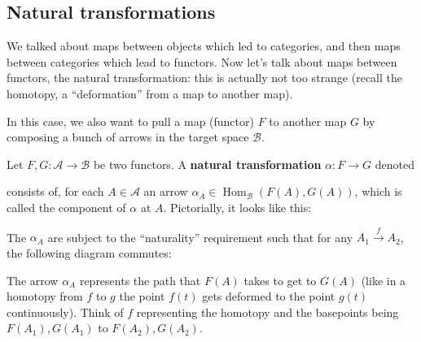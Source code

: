 \subsection{Natural transformations}
We talked about maps between objects which led to categories, and then maps between categories which lead to functors. Now let's talk about maps between functors, the natural transformation: this is actually not too strange (recall the homotopy, a ``deformation'' from a map to another map).

In this case, we also want to pull a map (functor) $F$ to another map $G$ by composing a bunch of arrows in the target space $\mathcal{B}$.
\begin{definition}
    Let $F,G \colon \mathcal{A} \to \mathcal{B}$ be two functors. A \textbf{natural transformation} $\alpha \colon F \to G$ denoted
            \begin{figure}[H]
                \centering
            \end{figure}
            consists of, for each $A\in \mathcal{A}$ an arrow $\alpha_A \in \operatorname{Hom}_{\mathcal{B}}(F(A),G(A))$, which is called the component of $\alpha$ at $A$. 
            Pictorially, it looks like this: 
            \begin{figure}[H]
                \centering
            \end{figure}
            The $\alpha_A$ are subject to the ``naturality'' requirement such that for any $A_1 \overset{f}{\to }A_2$, the following diagram commutes:
            \begin{figure}[H]
                \centering
            \end{figure}
            The arrow $\alpha_A$ represents the path that $F(A)$ takes to get to $G(A)$ (like in a homotopy from $f$ to $g$ the point $f(t)$ gets deformed to the point $g(t)$ continuously). Think of $f$ representing the homotopy and the basepoints being $F(A_1),G(A_1)$ to $F(A_2),G(A_2)$.
\end{definition}
